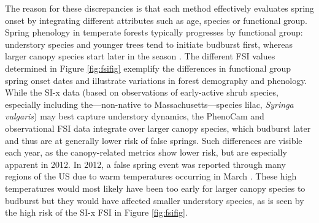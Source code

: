 \documentclass{article}\usepackage[]{graphicx}\usepackage[]{color}
\begin{document}
The reason for these discrepancies is that each method effectively evaluates spring onset by integrating different attributes such as age, species or functional group. Spring phenology in temperate forests typically progresses by functional group: understory species and younger trees tend to initiate budburst first, whereas larger canopy species start later in the season \citep{Richardson2009, Xin2016}. The different FSI values determined in Figure \ref{fig:fsifig} exemplify the differences in functional group spring onset dates and illustrate variations in forest demography and phenology. While the SI-x data (based on observations of early-active shrub species, especially including the---non-native to Massachusetts---species lilac, \emph{Syringa vulgaris}) may best capture understory dynamics, the PhenoCam and observational FSI data integrate over larger canopy species, which budburst later and thus are at generally lower risk of false springs. Such differences are visible each year, as the canopy-related metrics show lower risk, but are especially apparent in 2012. In 2012, a false spring event was reported through many regions of the US due to warm temperatures occurring in March \citep{Ault2015}. These high temperatures would most likely have been too early for larger canopy species to budburst but they would have affected smaller understory species, as is seen by the high risk of the SI-x FSI in Figure \ref{fig:fsifig}. 
\end{document}
